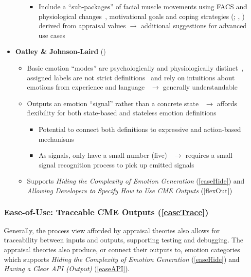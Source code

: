 \begin{itemize}
\begin{itemize}
\begin{itemize}
            \item Include a ``sub-packages'' of facial muscle movements using
            FACS and physiological
            changes~\citep[p.~133--135]{smith2001toward}, motivational goals
            and coping strategies (;
            , )
            derived from appraisal values $\rightarrow$ additional suggestions
            for advanced use cases
        \end{itemize}
    \end{itemize}

    \item \textbf{Oatley \& Johnson-Laird} (\strong)
    \begin{itemize}
        \item Basic emotion ``modes'' are psychologically and physiologically
        distinct~\citep[p.~48]{oatley1987towards}, assigned labels are not
        strict definitions~\citep[p.~217]{johnson1992basic} and rely on
        intuitions about emotions from experience and
        language~\citep[p.~69--71, 74--75, 82, 86--87]{oatley1992best}
        $\rightarrow$ generally understandable

        \item Outputs an emotion ``signal'' rather than a concrete
        state~\citep[p.~214]{johnson1992basic} $\rightarrow$ affords
        flexibility for both state-based and stateless emotion definitions
        \begin{itemize}
            \item Potential to connect both definitions to expressive and
            action-based mechanisms~\citep[p.~31]{oatley1987towards}

            \item As signals, only have a small number
            (five)~\citep[p.~33]{oatley1987towards} $\rightarrow$ requires a
            small signal recognition process to pick up emitted signals
        \end{itemize}

        \item Supports \textit{Hiding the Complexity of Emotion Generation}
        (\ref{easeHide}) and \textit{Allowing Developers to Specify How to Use
            CME Outputs} (\ref{flexOut})
    \end{itemize}
\end{itemize}

\subsubsection{Ease-of-Use: Traceable CME Outputs (\ref{easeTrace})}
Generally, the process view afforded by appraisal theories also allows for
traceability between inputs and outputs, supporting testing and debugging. The
appraisal theories also produce, or connect their outputs to, emotion
categories which supports \textit{Hiding the Complexity of Emotion Generation}
(\ref{easeHide}) and \textit{Having a Clear API (Output)} (\ref{easeAPI}).

